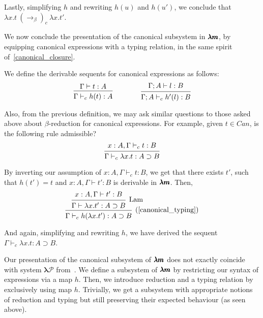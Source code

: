 Lastly, simplifying $h$ and rewriting $h(u)$ and $h(u')$, we conclude that $\lambda x.t \ (\to_\beta)_c \ \lambda x.t'$.

We now conclude the presentation of the canonical subsystem in $\pmb{\lambda m}$, by equipping canonical expressions with a typing relation, in the same spirit of~\cref{canonical_closure}.

\begin{definition}
  \label{canonical_typing}
  We define the derivable sequents for canonical expressions as follows:
  \[
    \begin{prooftree}
      \hypo{ \Gamma \vdash t:A }
      \infer1{ \Gamma \vdash_c h(t):A } 
    \end{prooftree}
    \qquad \qquad
    \begin{prooftree}
      \hypo{ \Gamma ; A \vdash l:B }
      \infer1{ \Gamma ; A \vdash_c h'(l):B }.
    \end{prooftree}
  \]
\end{definition}

Also, from the previous definition, we may ask similar questions to those asked above about $\beta$-reduction for canonical expressions.
For example, given $t \in Can$, is the following rule admissible?
\[
  \begin{prooftree}
    \hypo{ x:A, \Gamma \vdash_c t:B }
    \infer1{ \Gamma \vdash_c \lambda x.t : A \supset B } 
  \end{prooftree}
\]

By inverting our assumption of $x:A, \Gamma \vdash_c t:B$, we get that there exists $t'$, such that $h(t') = t$ and $x:A, \Gamma \vdash t':B$ is derivable in $\pmb{\lambda m}$. Then,
\[
  \begin{prooftree}
    \hypo{ x:A, \Gamma \vdash t':B }
    \infer1[Lam]{ \Gamma \vdash \lambda x . t' : A \supset B }
    \infer1[\text{(\cref{canonical_typing})}]{ \Gamma \vdash_c h(\lambda x . t') : A \supset B }
  \end{prooftree}
\]

And again, simplifying and rewriting $h$, we have derived the sequent $\Gamma \vdash_c \lambda x.t : A \supset B$.

Our presentation of the canonical subsystem of $\pmb{\lambda m}$ does not exactly coincide with system $\pmb{\lambda \mathcal{P}}$ from~\cite[Chapter~3.1]{JCES2002}.
We define a subsystem of $\pmb{\lambda m}$ by restricting our syntax of expressions via a map $h$.
Then, we introduce reduction and a typing relation by exclusively using map $h$.
Trivially, we get a subsystem with appropriate notions of reduction and typing but still preserving their expected behaviour (as seen above).

